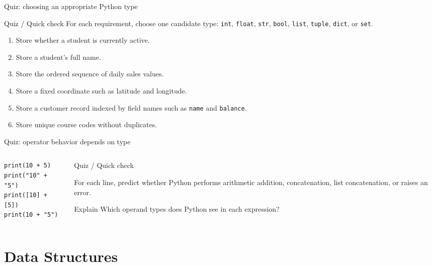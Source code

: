 \documentclass[aspectratio=169]{beamer}
\newcommand{\quizblock}[1]{%
  \begin{alertblock}{Quiz / Quick check}
    #1
  \end{alertblock}
}
\begin{document}
\begin{frame}{Quiz: choosing an appropriate Python type}
\small
\quizblock{For each requirement, choose one candidate type: \texttt{int}, \texttt{float}, \texttt{str}, \texttt{bool}, \texttt{list}, \texttt{tuple}, \texttt{dict}, or \texttt{set}.}
\vspace{0.3em}
\begin{enumerate}
  \item Store whether a student is currently active.
  \item Store a student's full name.
  \item Store the ordered sequence of daily sales values.
  \item Store a fixed coordinate such as latitude and longitude.
  \item Store a customer record indexed by field names such as \texttt{name} and \texttt{balance}.
  \item Store unique course codes without duplicates.
\end{enumerate}
\end{frame}

\begin{frame}[fragile]{Quiz: operator behavior depends on type}
\small
\begin{columns}[T]
\begin{column}{0.52\textwidth}
\begin{lstlisting}[basicstyle=\ttfamily\scriptsize]
print(10 + 5)
print("10" + "5")
print([10] + [5])
print(10 + "5")
\end{lstlisting}
\end{column}
\begin{column}{0.44\textwidth}
\quizblock{
For each line, predict whether Python performs arithmetic addition,
concatenation, list concatenation, or raises an error.
}
\begin{exampleblock}{Explain}
Which operand types does Python see in each expression?
\end{exampleblock}
\end{column}
\end{columns}
\end{frame}

\section{Data Structures}
\end{document}
